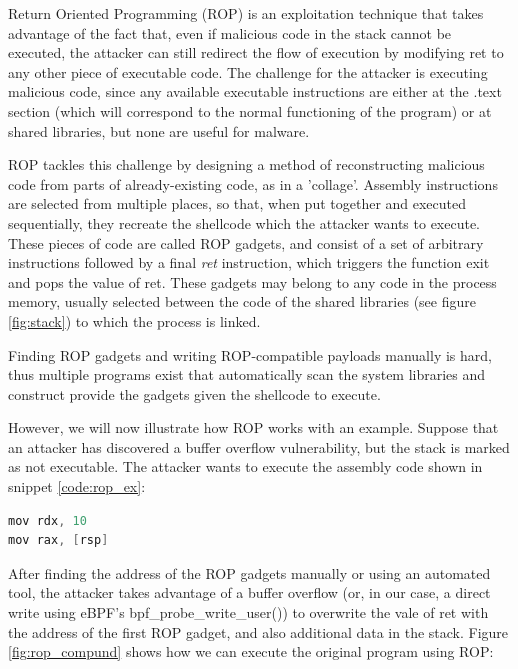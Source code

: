 \documentclass[12pt]{report} %
\begin{document}
Return Oriented Programming (ROP) is an exploitation technique that takes advantage of the fact that, even if malicious code in the stack cannot be executed, the attacker can still redirect the flow of execution by modifying ret to any other piece of executable code. The challenge for the attacker is executing malicious code, since any available executable instructions are either at the .text section (which will correspond to the normal functioning of the program) or at shared libraries, but none are useful for malware. 

ROP tackles this challenge by designing a method of reconstructing malicious code from parts of already-existing code, as in a 'collage'. Assembly instructions are selected from multiple places, so that, when put together and executed sequentially, they recreate the shellcode which the attacker wants to execute. These pieces of code are called ROP gadgets, and consist of a set of arbitrary instructions followed by a final \textit{ret} instruction, which triggers the function exit and pops the value of ret. These gadgets may belong to any code in the process memory, usually selected between the code of the shared libraries (see figure \ref{fig:stack}) to which the process is linked.

Finding ROP gadgets and writing ROP-compatible payloads manually is hard, thus multiple programs exist that automatically scan the system libraries and construct provide the gadgets given the shellcode to execute\cite{rop_prog_finder}.

However, we will now illustrate how ROP works with an example. Suppose that an attacker has discovered a buffer overflow vulnerability, but the stack is marked as not executable. The attacker wants to execute the assembly code shown in snippet \ref{code:rop_ex}:

\begin{lstlisting}[language=C, caption={Sample program to run using ROP.}, label={code:rop_ex}]
mov rdx, 10
mov rax, [rsp]
\end{lstlisting}

After finding the address of the ROP gadgets manually or using an automated tool, the attacker takes advantage of a buffer overflow (or, in our case, a direct write using eBPF's bpf\_probe\_write\_user()) to overwrite the vale of ret with the address of the first ROP gadget, and also additional data in the stack. Figure \ref{fig:rop_compund} shows how we can execute the original program using ROP:
\end{document}
